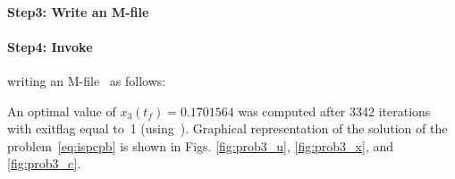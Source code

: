 {\small }

\paragraph{Step3: Write an M-file~}

{\small }

\paragraph{Step4: Invoke~} writing an
M-file~ as follows: 

{\small }

An optimal value of $x_{3}(t_{f})=0.1701564$ was computed after 3342
iterations with exitflag equal to~1 (using~). Graphical
representation of the solution of the problem~\eqref{eq:ispcpb} is
shown in Figs. \ref{fig:prob3_u}, \ref{fig:prob3_x}, and
\ref{fig:prob3_c}.

